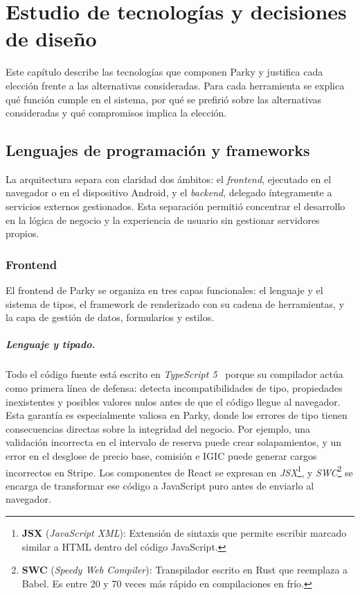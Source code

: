 \chapter{Estudio de tecnologías y decisiones de diseño}
\label{ch:estudio-tecnologias}

Este capítulo describe las tecnologías que componen Parky y justifica cada elección frente a las alternativas consideradas. Para cada herramienta se explica qué función cumple en el sistema, por qué se prefirió sobre las alternativas consideradas y qué compromisos implica la elección.

\section{Lenguajes de programación y frameworks}
\label{sec:lenguajes}

La arquitectura separa con claridad dos ámbitos: el \textit{frontend}, ejecutado en el navegador o en el dispositivo Android, y el \textit{backend}, delegado íntegramente a servicios externos gestionados. Esta separación permitió concentrar el desarrollo en la lógica de negocio y la experiencia de usuario sin gestionar servidores propios.

\subsection{Frontend}
\label{subsec:frontend}

El frontend de Parky se organiza en tres capas funcionales: el lenguaje y el sistema de tipos, el framework de renderizado con su cadena de herramientas, y la capa de gestión de datos, formularios y estilos.

\paragraph{Lenguaje y tipado.}
Todo el código fuente está escrito en \textit{TypeScript 5}~\cite{typescript2024} porque su compilador actúa como primera línea de defensa: detecta incompatibilidades de tipo, propiedades inexistentes y posibles valores nulos antes de que el código llegue al navegador. Esta garantía es especialmente valiosa en Parky, donde los errores de tipo tienen consecuencias directas sobre la integridad del negocio. Por ejemplo, una validación incorrecta en el intervalo de reserva puede crear solapamientos, y un error en el desglose de precio base, comisión e IGIC puede generar cargos incorrectos en Stripe. Los componentes de React se expresan en \textit{JSX}\footnote{\textbf{JSX} (\textit{JavaScript XML}): Extensión de sintaxis que permite escribir marcado similar a HTML dentro del código JavaScript.}, y \textit{SWC}\footnote{\textbf{SWC} (\textit{Speedy Web Compiler}): Transpilador escrito en Rust que reemplaza a Babel. Es entre 20 y 70 veces más rápido en compilaciones en frío.} se encarga de transformar ese código a JavaScript puro antes de enviarlo al navegador.

